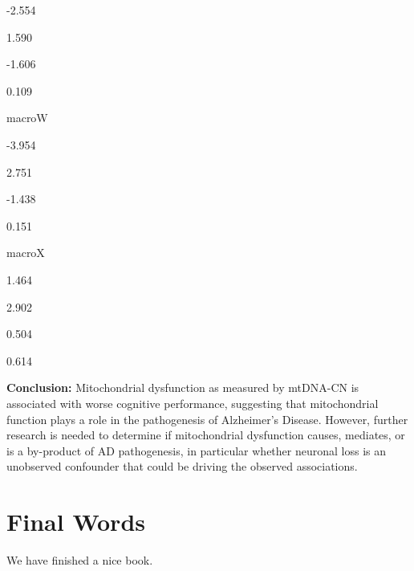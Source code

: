 \documentclass[]{book}
\begin{document}
-2.554

1.590

-1.606

0.109

macroW

-3.954

2.751

-1.438

0.151

macroX

1.464

2.902

0.504

0.614

\textbf{Conclusion:} Mitochondrial dysfunction as measured by mtDNA-CN is associated with worse cognitive performance, suggesting that mitochondrial function plays a role in the pathogenesis of Alzheimer's Disease. However, further research is needed to determine if mitochondrial dysfunction causes, mediates, or is a by-product of AD pathogenesis, in particular whether neuronal loss is an unobserved confounder that could be driving the observed associations.

\hypertarget{final-words}{%
\chapter{Final Words}\label{final-words}}

We have finished a nice book.


\end{document}
